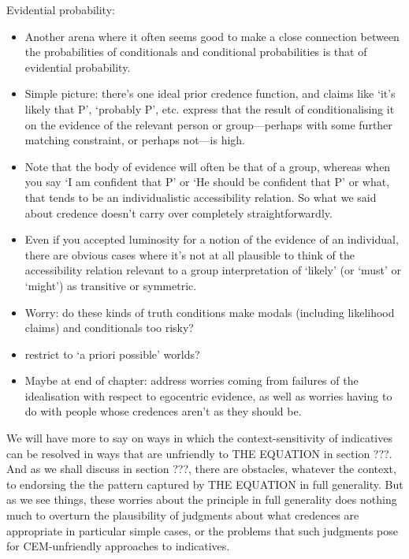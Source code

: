 \documentclass[If.tex]{subfiles}
\begin{document}
Evidential probability:
\begin{itemize}
	\item
	Another arena where it often seems good to make a close connection between the probabilities of conditionals and conditional probabilities is that of evidential probability.  
	\item
	Simple picture: there's one ideal prior credence function, and claims like ‘it's likely that P’, ‘probably P’, etc. express that the result of conditionalising it on the evidence of the relevant person or group---perhaps with some further matching constraint, or perhaps not---is high.  
	\item
	Note that the body of evidence will often be that of a group, whereas when you say ‘I am confident that P’ or ‘He should be confident that P’ or what, that tends to be an individualistic accessibility relation.  So what we said about credence doesn't carry over completely straightforwardly.  
	\item
	Even if you accepted luminosity for a notion of the evidence of an individual, there are obvious cases where it's not at all plausible to think of the accessibility relation relevant to a group interpretation of ‘likely’ (or ‘must’ or ‘might’) as transitive or symmetric.  
	\item
	Worry: do these kinds of truth conditions make modals (including likelihood claims) and conditionals too risky?  
\end{itemize}



\begin{itemize}
	\item
  restrict to ‘a priori possible’ worlds?
	\item
	Maybe at end of chapter: address worries coming from failures of the idealisation with respect to egocentric evidence, as well as worries having to do with people whose credences aren't as they should be.  
\end{itemize}




We will have more to say on ways in which the context-sensitivity of indicatives can be resolved in ways that are unfriendly to THE EQUATION in section ???. And as we shall discuss in section ???, there are obstacles, whatever the context, to endorsing the the pattern captured by THE EQUATION in full generality. But as we see things, these worries about the principle in full generality does nothing much to overturn the plausibility of judgments about what credences are appropriate in particular simple cases, or the problems that such judgments pose for CEM-unfriendly approaches to indicatives.
\end{document}

